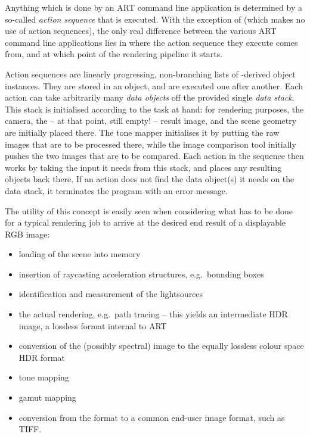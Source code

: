 Anything which is done by an ART command line application is determined by a so-called \emph{action sequence} that is executed. With the exception of  (which makes no use of action sequences), the only real difference between the various ART command line applications lies in where the action sequence they execute comes from, and at which point of the rendering pipeline it starts.

Action sequences are linearly progressing, non-branching lists of -derived object instances. They
are stored in an  object, and are executed one after another. Each action can
take arbitrarily many \emph{data objects} off the provided single \emph{data stack}. This stack is initialised according to the task at hand: for rendering purposes, the camera, the -- at that point, still empty! -- result image, and the scene geometry are initially placed there. The tone mapper initialises it by putting the raw images that are to be processed there, while the image comparison tool initially pushes the two images that are to be compared. Each action in the sequence then works by taking the input it needs from this stack, and places any resulting objects back there. If an action does not find the data object(s) it needs on the data stack, it terminates the program with an error message.

The utility of this concept is easily seen when considering what has to be done for a typical rendering job to arrive at the desired end result of a displayable RGB image: 
\begin{itemize}
\item loading of the scene into memory
\item insertion of raycasting acceleration structures, e.g.\ bounding
  boxes
\item identification and measurement of the lightsources
\item the actual rendering, e.g.\ path tracing -- this yields an intermediate  HDR image, a lossless format internal to ART
\item conversion of the (possibly spectral)  image to the equally lossless
  colour space HDR format 
\item tone mapping
\item gamut mapping
\item conversion from the  format
  to a common end-user image format, such as TIFF.
\end{itemize}


